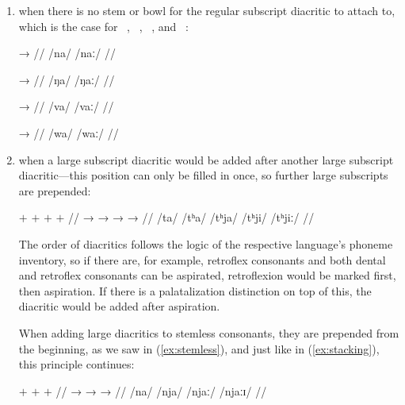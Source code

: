 \begin{enumerate}
\item when there is no stem or bowl for the regular subscript diacritic to 
	attach to, which is the case for ~, ~, 
	~, and ~:
	
	\begin{multicols}{2}
	\pex[lingstyle=thex,everyglb=\itshape]\label{ex:stemless}
	\a\begingl
		\gla {} →  //
		\glb /na/ {} /naː/ //
	\endgl
	
	\a\begingl
		\gla {} →  //
		\glb /ŋa/ {} /ŋaː/ //
	\endgl
	
	\a\begingl
		\gla {} →  //
		\glb /va/ {} /vaː/ //
	\endgl
	
	\a\begingl
		\gla {} →  //
		\glb /wa/ {} /waː/ //
	\endgl
	
	\xe
	\end{multicols}

\item when a large subscript diacritic would be added after another large 
	subscript diacritic---this position can only be filled in once, so 
	further large subscripts are prepended:
	
	\ex[lingstyle=thex,everygla=\normalsize,everyglb=\upshape\Large,
		aboveglcskip=0.5em,numoffset=\leftmargin]\label{ex:stacking}
	\begingl
		\gla {} {$+$ } {} {$+$ } {} {$+$ } {}
			{$+$ } {} //
		\glb {} →  →  →  → 
			 //
		\glc /ta/ {} /tʰa/ {} /tʰja/ {} /tʰji/ {} /tʰjiː/ //
	\endgl\xe
	
	The order of diacritics follows the logic of the respective 
	language's phoneme inventory, so if there are, for example, 
	retroflex consonants and both dental and retroflex consonants can be 
	aspirated, retroflexion would be marked first, then aspiration. If 
	there is a palatalization distinction on top of this, the diacritic 
	would be added after aspiration.
	
	When adding large diacritics to stemless consonants, they are prepended 
	from the beginning, as we saw in (\ref{ex:stemless}), and just like in 
	(\ref{ex:stacking}), this principle continues:
	
	\ex[lingstyle=thex,everygla=\normalsize,everyglb=\upshape\Large,
		aboveglcskip=0.5em,numoffset=\leftmargin]
	\begingl
		\gla {} {$+$ } {} {$+$ } {} {$+$ } 
			{} //
		\glb {} →  →  →  //
		\glc /na/ {} /nja/ {} /njaː/ {} /njaːɪ/ //
	\endgl\xe


\end{enumerate}
